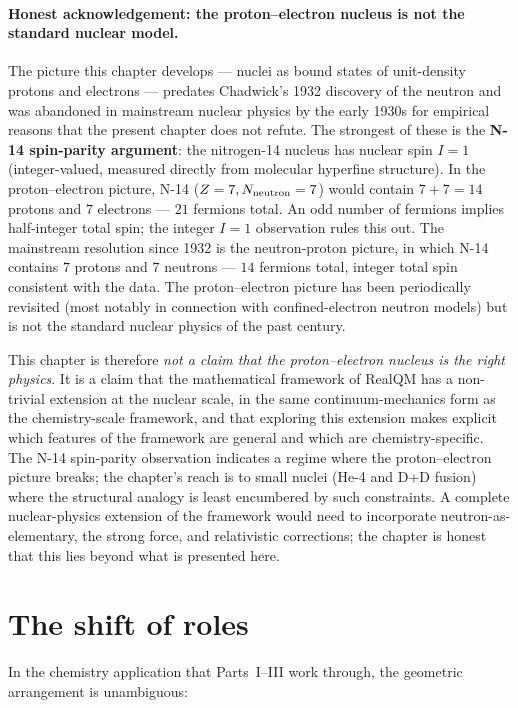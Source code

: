 \paragraph{Honest acknowledgement: the proton--electron nucleus is not the standard nuclear model.}
The picture this chapter develops --- nuclei as bound states of unit-density protons and electrons --- predates Chadwick's 1932 discovery of the neutron and was abandoned in mainstream nuclear physics by the early 1930s for empirical reasons that the present chapter does not refute. The strongest of these is the \textbf{N-14 spin-parity argument}: the nitrogen-14 nucleus has nuclear spin $I = 1$ (integer-valued, measured directly from molecular hyperfine structure). In the proton--electron picture, N-14 ($Z = 7, N_{\rm neutron} = 7$) would contain $7 + 7 = 14$ protons and $7$ electrons --- $21$ fermions total. An odd number of fermions implies half-integer total spin; the integer $I = 1$ observation rules this out. The mainstream resolution since 1932 is the neutron-proton picture, in which N-14 contains $7$ protons and $7$ neutrons --- $14$ fermions total, integer total spin consistent with the data. The proton--electron picture has been periodically revisited (most notably in connection with confined-electron neutron models) but is not the standard nuclear physics of the past century.

This chapter is therefore \emph{not a claim that the proton--electron nucleus is the right physics}. It is a claim that the mathematical framework of RealQM has a non-trivial extension at the nuclear scale, in the same continuum-mechanics form as the chemistry-scale framework, and that exploring this extension makes explicit which features of the framework are general and which are chemistry-specific. The N-14 spin-parity observation indicates a regime where the proton--electron picture breaks; the chapter's reach is to small nuclei (He-4 and D+D fusion) where the structural analogy is least encumbered by such constraints. A complete nuclear-physics extension of the framework would need to incorporate neutron-as-elementary, the strong force, and relativistic corrections; the chapter is honest that this lies beyond what is presented here.

\section{The shift of roles}\label{sec:role-shift}

In the chemistry application that Parts~I--III work through, the geometric arrangement is unambiguous:

